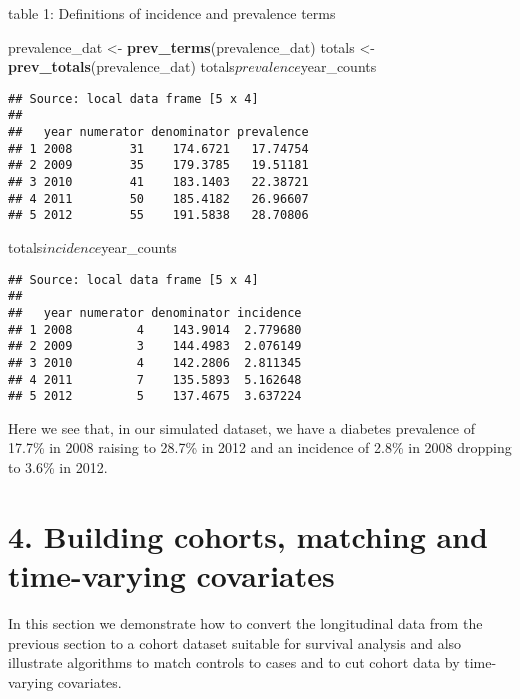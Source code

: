 \documentclass[]{article}
\newenvironment{Shaded}{\begin{snugshade}}{\end{snugshade}}
\newcommand{\KeywordTok}[1]{\textcolor[rgb]{0.13,0.29,0.53}{\textbf{{#1}}}}
\newcommand{\StringTok}[1]{\textcolor[rgb]{0.31,0.60,0.02}{{#1}}}
\newcommand{\NormalTok}[1]{{#1}}
\begin{document}
table 1: Definitions of incidence and prevalence terms

\begin{Shaded}
\begin{Highlighting}[]
\NormalTok{prevalence_dat <-}\StringTok{ }\KeywordTok{prev_terms}\NormalTok{(prevalence_dat)}
\NormalTok{totals <-}\StringTok{ }\KeywordTok{prev_totals}\NormalTok{(prevalence_dat)}
\NormalTok{totals$prevalence$year_counts}
\end{Highlighting}
\end{Shaded}

\begin{verbatim}
## Source: local data frame [5 x 4]
## 
##   year numerator denominator prevalence
## 1 2008        31    174.6721   17.74754
## 2 2009        35    179.3785   19.51181
## 3 2010        41    183.1403   22.38721
## 4 2011        50    185.4182   26.96607
## 5 2012        55    191.5838   28.70806
\end{verbatim}

\begin{Shaded}
\begin{Highlighting}[]
\NormalTok{totals$incidence$year_counts}
\end{Highlighting}
\end{Shaded}

\begin{verbatim}
## Source: local data frame [5 x 4]
## 
##   year numerator denominator incidence
## 1 2008         4    143.9014  2.779680
## 2 2009         3    144.4983  2.076149
## 3 2010         4    142.2806  2.811345
## 4 2011         7    135.5893  5.162648
## 5 2012         5    137.4675  3.637224
\end{verbatim}

Here we see that, in our simulated dataset, we have a diabetes
prevalence of 17.7\% in 2008 raising to 28.7\% in 2012 and an incidence
of 2.8\% in 2008 dropping to 3.6\% in 2012.

\section{4. Building cohorts, matching and time-varying
covariates}\label{building-cohorts-matching-and-time-varying-covariates}

In this section we demonstrate how to convert the longitudinal data from
the previous section to a cohort dataset suitable for survival analysis
and also illustrate algorithms to match controls to cases and to cut
cohort data by time-varying covariates.
\end{document}
